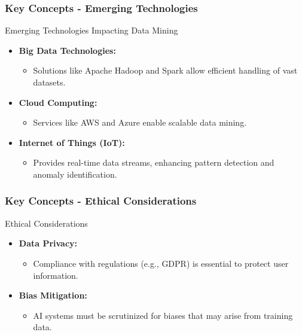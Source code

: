 \documentclass[aspectratio=169]{beamer}
\begin{document}
\begin{frame}[fragile]
    \frametitle{Key Concepts - Emerging Technologies}
    \begin{block}{Emerging Technologies Impacting Data Mining}
        \begin{itemize}
            \item \textbf{Big Data Technologies:} 
                \begin{itemize}
                    \item Solutions like Apache Hadoop and Spark allow efficient handling of vast datasets.
                \end{itemize}
            \item \textbf{Cloud Computing:} 
                \begin{itemize}
                    \item Services like AWS and Azure enable scalable data mining.
                \end{itemize}
            \item \textbf{Internet of Things (IoT):} 
                \begin{itemize}
                    \item Provides real-time data streams, enhancing pattern detection and anomaly identification.
                \end{itemize}
        \end{itemize}
    \end{block}
\end{frame}

\begin{frame}[fragile]
    \frametitle{Key Concepts - Ethical Considerations}
    \begin{block}{Ethical Considerations}
        \begin{itemize}
            \item \textbf{Data Privacy:} 
                \begin{itemize}
                    \item Compliance with regulations (e.g., GDPR) is essential to protect user information.
                \end{itemize}
            \item \textbf{Bias Mitigation:} 
                \begin{itemize}
                    \item AI systems must be scrutinized for biases that may arise from training data.
                \end{itemize}
        \end{itemize}
    \end{block}
\end{frame}
\end{document}
